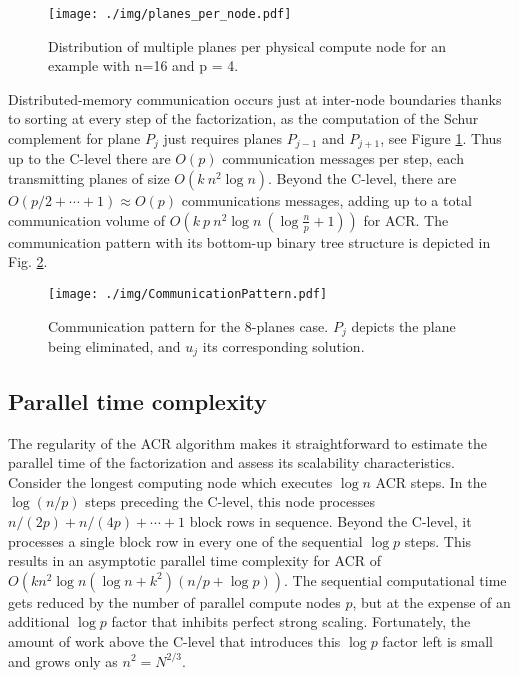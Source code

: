 \documentclass[]{elsarticle}
\begin{document}
\begin{figure}[H]
\centering
\texttt{[image: ./img/planes\_per\_node.pdf]}
\caption{Distribution of multiple planes per physical compute node for an example with n=16 and p = 4.}
\label{planes_per_node}
\end{figure}

Distributed-memory communication occurs just at inter-node boundaries thanks to sorting at every step of the factorization, as the computation of the Schur complement for plane $P_{j}$ just requires planes $P_{j-1}$ and $P_{j+1}$, see Figure \ref{planes_per_node}. Thus up to the C-level there are $O(p)$ communication messages per step, each transmitting planes of size $O(k~n^2 \log n)$. Beyond the C-level, there are $O(p/2+\cdots+1) \approx O(p)$ communications messages, adding up to a total communication volume of $O(k~p~n^2 \log n~ ( \log \frac{n}{p}+1 ) )$ for ACR. The communication pattern with its bottom-up binary tree structure is depicted in Fig. \ref{CommunicationPattern}.

\begin{figure}[H]
\texttt{[image: ./img/CommunicationPattern.pdf]}
\centering
\caption{Communication pattern for the 8-planes case. $P_j$ depicts the plane being eliminated, and $u_j$ its corresponding solution.}
\label{CommunicationPattern}
\end{figure}

\subsection{Parallel time complexity}

The regularity of the ACR algorithm makes it straightforward to estimate the parallel time of the factorization and assess its scalability characteristics. Consider the longest computing node which executes $\log n$ ACR steps. In the $\log (n/p)$ steps preceding the C-level, this node processes $n/(2p) + n/(4p) + \cdots + 1$ block rows in sequence. Beyond the C-level, it processes a single block row in every one of the sequential $\log p$ steps. This results in an asymptotic parallel time complexity for ACR of $O\left( k n^2\log n (\log n + k^2) ( n/p + \log p ) \right)$. The sequential computational time gets reduced by the number of parallel compute nodes $p$, but at the expense of an additional $\log p$ factor that inhibits perfect strong scaling. Fortunately, the amount of work above the C-level that introduces this $\log p$ factor left is small and grows only as $n^2 = N^{2/3}$. 
\end{document}
